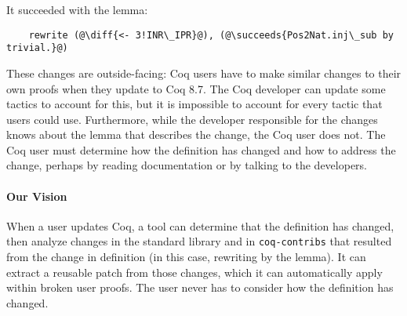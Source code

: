 It succeeded with the lemma:

\begin{lstlisting}
    rewrite (@\diff{<- 3!INR\_IPR}@), (@\succeeds{Pos2Nat.inj\_sub by trivial.}@)
\end{lstlisting}

These changes are outside-facing: Coq users have to make similar changes to their own proofs when
they update to Coq 8.7. The Coq developer can update some tactics to account for this, but it is 
impossible to account for every tactic that users could use.
Furthermore, while the developer responsible for the changes knows about
the lemma that describes the change, the Coq user does not. The Coq user must determine
how the definition has changed and how to address the change, perhaps by reading documentation or by
talking to the developers. 

\paragraph{Our Vision} When a user updates Coq, a tool can determine
that the definition has changed, then analyze changes in the standard library and in \lstinline{coq-contribs}
that resulted from the change in definition (in this case, rewriting by the lemma).
It can extract a reusable patch from those changes, which it can automatically apply within broken user proofs.
The user never has to consider how the definition has changed.



